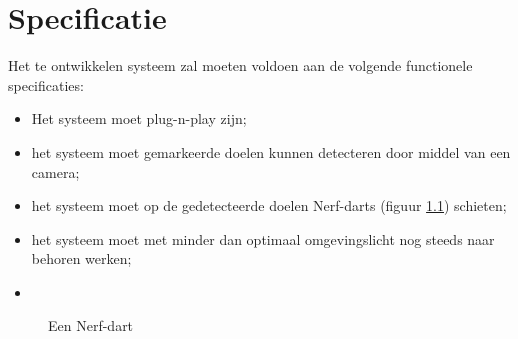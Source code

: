 \chapter{Specificatie}

Het te ontwikkelen systeem zal moeten voldoen aan de volgende functionele
specificaties:

\begin{itemize}
    \item Het systeem moet plug-n-play zijn;
    \item het systeem moet gemarkeerde doelen kunnen detecteren door middel van
        een camera;
    \item het systeem moet op de gedetecteerde doelen Nerf-darts (figuur
        \ref{fig:dart}) schieten;
    \item het systeem moet met minder dan optimaal omgevingslicht nog steeds
        naar behoren werken;
    \item 
\end{itemize}

\begin{figure}
    \caption{Een Nerf-dart}
    \label{fig:dart}
\end{figure}
